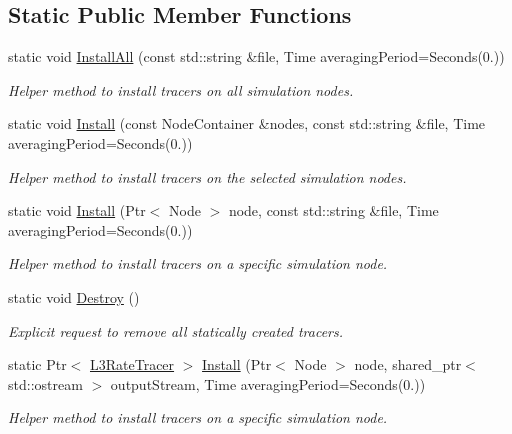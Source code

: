 \subsection*{Static Public Member Functions}
\begin{DoxyCompactItemize}
\item 
static void \hyperlink{classns3_1_1ndn_1_1L3RateTracer_a68d3e442b9589a86b8fdfbb48dd533a2}{Install\+All} (const std\+::string \&file, Time averaging\+Period=Seconds(0.))
\begin{DoxyCompactList}\small\item\em Helper method to install tracers on all simulation nodes. \end{DoxyCompactList}\item 
static void \hyperlink{classns3_1_1ndn_1_1L3RateTracer_a0d067ab25028a465238b8d9508ce8b8d}{Install} (const Node\+Container \&nodes, const std\+::string \&file, Time averaging\+Period=Seconds(0.))
\begin{DoxyCompactList}\small\item\em Helper method to install tracers on the selected simulation nodes. \end{DoxyCompactList}\item 
static void \hyperlink{classns3_1_1ndn_1_1L3RateTracer_a56d4c314dc9495416c4cb3aed54d97a7}{Install} (Ptr$<$ Node $>$ node, const std\+::string \&file, Time averaging\+Period=Seconds(0.))
\begin{DoxyCompactList}\small\item\em Helper method to install tracers on a specific simulation node. \end{DoxyCompactList}\item 
static void \hyperlink{classns3_1_1ndn_1_1L3RateTracer_a099a6429d34d063ba8114b00b15f12ec}{Destroy} ()
\begin{DoxyCompactList}\small\item\em Explicit request to remove all statically created tracers. \end{DoxyCompactList}\item 
static Ptr$<$ \hyperlink{classns3_1_1ndn_1_1L3RateTracer}{L3\+Rate\+Tracer} $>$ \hyperlink{classns3_1_1ndn_1_1L3RateTracer_a1c3e66e358fa003f0bf8fea72eb68a36}{Install} (Ptr$<$ Node $>$ node, shared\+\_\+ptr$<$ std\+::ostream $>$ output\+Stream, Time averaging\+Period=Seconds(0.))
\begin{DoxyCompactList}\small\item\em Helper method to install tracers on a specific simulation node. \end{DoxyCompactList}\end{DoxyCompactItemize}
